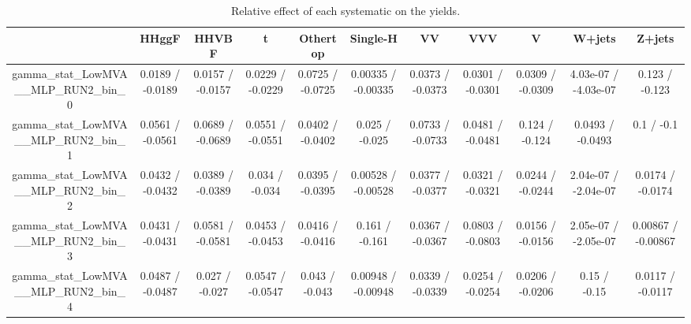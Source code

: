 \documentclass[10pt]{article}
\begin{document}
\begin{table}[htbp]
\begin{center}
\begin{tabular}{|c|c|c|c|c|c|c|c|c|c|c|}
\hline 
      & HHggF      & HHVBF      & t      & Othertop      & Single-H      & VV      & VVV      & V      & W+jets      & Z+jets \\ 
\hline 
  gamma_stat_LowMVA__MLP_RUN2_bin_0 & 0.0189 / -0.0189 & 0.0157 / -0.0157 & 0.0229 / -0.0229 & 0.0725 / -0.0725 & 0.00335 / -0.00335 & 0.0373 / -0.0373 & 0.0301 / -0.0301 & 0.0309 / -0.0309 & 4.03e-07 / -4.03e-07 & 0.123 / -0.123 \\ 
  gamma_stat_LowMVA__MLP_RUN2_bin_1 & 0.0561 / -0.0561 & 0.0689 / -0.0689 & 0.0551 / -0.0551 & 0.0402 / -0.0402 & 0.025 / -0.025 & 0.0733 / -0.0733 & 0.0481 / -0.0481 & 0.124 / -0.124 & 0.0493 / -0.0493 & 0.1 / -0.1 \\ 
  gamma_stat_LowMVA__MLP_RUN2_bin_2 & 0.0432 / -0.0432 & 0.0389 / -0.0389 & 0.034 / -0.034 & 0.0395 / -0.0395 & 0.00528 / -0.00528 & 0.0377 / -0.0377 & 0.0321 / -0.0321 & 0.0244 / -0.0244 & 2.04e-07 / -2.04e-07 & 0.0174 / -0.0174 \\ 
  gamma_stat_LowMVA__MLP_RUN2_bin_3 & 0.0431 / -0.0431 & 0.0581 / -0.0581 & 0.0453 / -0.0453 & 0.0416 / -0.0416 & 0.161 / -0.161 & 0.0367 / -0.0367 & 0.0803 / -0.0803 & 0.0156 / -0.0156 & 2.05e-07 / -2.05e-07 & 0.00867 / -0.00867 \\ 
  gamma_stat_LowMVA__MLP_RUN2_bin_4 & 0.0487 / -0.0487 & 0.027 / -0.027 & 0.0547 / -0.0547 & 0.043 / -0.043 & 0.00948 / -0.00948 & 0.0339 / -0.0339 & 0.0254 / -0.0254 & 0.0206 / -0.0206 & 0.15 / -0.15 & 0.0117 / -0.0117 \\ 
\hline 
\end{tabular} 
\caption{Relative effect of each systematic on the yields.} 
\end{center} 
\end{table} 
\end{document}
